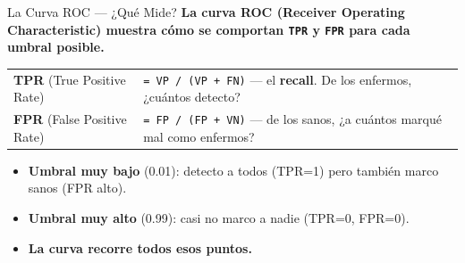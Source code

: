 \documentclass[aspectratio=169, 11pt]{beamer}
\begin{document}
\begin{frame}{La Curva ROC --- ¿Qué Mide?}
  \vspace{-4pt}
  {\footnotesize\color{arcaDark}\bfseries
    La curva \textbf{ROC} (Receiver Operating Characteristic) muestra cómo
    se comportan \texttt{TPR} y \texttt{FPR} para \textbf{cada umbral posible}.}

  \vspace{6pt}
  {\scriptsize
  \begin{tabular}{@{}lp{9cm}@{}}
    \toprule
    \textbf{TPR} (True Positive Rate) & \texttt{= VP / (VP + FN)} --- el \textbf{recall}. De los enfermos, ¿cuántos detecto? \\
    \textbf{FPR} (False Positive Rate) & \texttt{= FP / (FP + VN)} --- de los sanos, ¿a cuántos marqué mal como enfermos? \\
    \bottomrule
  \end{tabular}
  }

  \vspace{8pt}
  {\footnotesize
  \begin{itemize}\setlength{\itemsep}{4pt}
    \item[{\color{arcaRed}\scriptsize\faArrowRight}]
      \textbf{Umbral muy bajo} (0.01): detecto a todos (TPR=1) pero también
      marco sanos (FPR alto).
    \item[{\color{arcaRed}\scriptsize\faArrowRight}]
      \textbf{Umbral muy alto} (0.99): casi no marco a nadie (TPR=0, FPR=0).
    \item[{\color{arcaRed}\scriptsize\faArrowRight}]
      \textbf{La curva recorre todos esos puntos.}
  \end{itemize}
  }
\end{frame}
\end{document}
